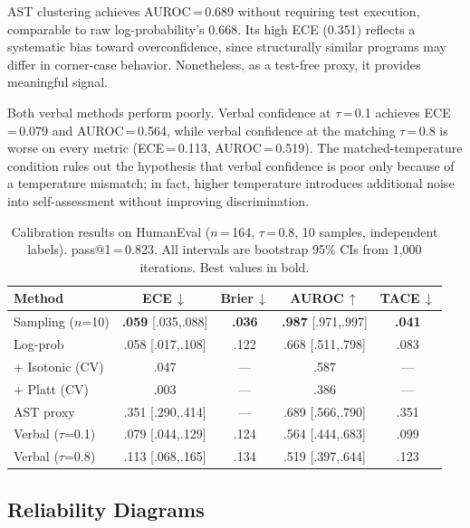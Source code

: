 \documentclass{article}
\begin{document}
AST clustering achieves AUROC\,=\,0.689 without requiring test execution, comparable to raw log-probability's 0.668. Its high ECE (0.351) reflects a systematic bias toward overconfidence, since structurally similar programs may differ in corner-case behavior. Nonetheless, as a test-free proxy, it provides meaningful signal.

Both verbal methods perform poorly. Verbal confidence at $\tau$\,=\,0.1 achieves ECE\,=\,0.079 and AUROC\,=\,0.564, while verbal confidence at the matching $\tau$\,=\,0.8 is worse on every metric (ECE\,=\,0.113, AUROC\,=\,0.519). The matched-temperature condition rules out the hypothesis that verbal confidence is poor only because of a temperature mismatch; in fact, higher temperature introduces additional noise into self-assessment without improving discrimination.

\begin{table}[t]
\centering
\caption{Calibration results on HumanEval ($n$\,=\,164, $\tau$\,=\,0.8, 10 samples, independent labels). pass@1\,=\,0.823. All intervals are bootstrap 95\% CIs from 1{,}000 iterations. Best values in bold.}
\label{tab:main}
\small
\setlength{\tabcolsep}{2pt}
\begin{tabular}{@{}lcccc@{}}
\toprule
\textbf{Method} & \textbf{ECE\,$\downarrow$} & \textbf{Brier\,$\downarrow$} & \textbf{AUROC\,$\uparrow$} & \textbf{TACE\,$\downarrow$} \\
\midrule
Sampling ($n$=10) & \textbf{.059} {\scriptsize[.035,.088]} & \textbf{.036} & \textbf{.987} {\scriptsize[.971,.997]} & \textbf{.041} \\
Log-prob & .058 {\scriptsize[.017,.108]} & .122 & .668 {\scriptsize[.511,.798]} & .083 \\
\; + Isotonic (CV) & .047 & --- & .587 & --- \\
\; + Platt (CV) & .003 & --- & .386 & --- \\
AST proxy & .351 {\scriptsize[.290,.414]} & --- & .689 {\scriptsize[.566,.790]} & .351 \\
Verbal ($\tau$=0.1) & .079 {\scriptsize[.044,.129]} & .124 & .564 {\scriptsize[.444,.683]} & .099 \\
Verbal ($\tau$=0.8) & .113 {\scriptsize[.068,.165]} & .134 & .519 {\scriptsize[.397,.644]} & .123 \\
\bottomrule
\end{tabular}
\vspace{-0.5em}
\end{table}

\subsection{Reliability Diagrams}
\label{sec:reliability}
\end{document}

